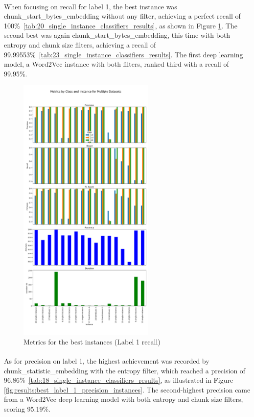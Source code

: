 \paragraph{}When focusing on recall for label 1, the best instance was chunk\_start\_bytes\_embedding without any filter, achieving a perfect recall of 100\%~\ref{tab:20_single_instance_classifiers_results}, as shown in Figure \ref{fig:results:best_label_1_recall_instances}. The second-best was again chunk\_start\_bytes\_embedding, this time with both entropy and chunk size filters, achieving a recall of 99.99553\%~\ref{tab:23_single_instance_classifiers_results}. The first deep learning model, a Word2Vec instance with both filters, ranked third with a recall of 99.95\%.

\begin{figure}[ht]
    \centering
    \includegraphics[width=0.6\textwidth]{img/annexes/Best 1.0 Recall (by instances).png}
    \caption{Metrics for the best instances (Label 1 recall)}
    \label{fig:results:best_label_1_recall_instances}
\end{figure}

\paragraph{}As for precision on label 1, the highest achievement was recorded by chunk\_statistic\_embedding with the entropy filter, which reached a precision of 96.86\%~\ref{tab:18_single_instance_classifiers_results}, as illustrated in Figure \ref{fig:results:best_label_1_precision_instances}. The second-highest precision came from a Word2Vec deep learning model with both entropy and chunk size filters, scoring 95.19\%.


